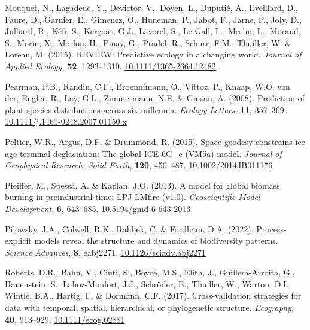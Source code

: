 \documentclass[11pt,]{article}
\newlength{\cslhangindent}
\newenvironment{CSLReferences}[2] %
 {%
  \setlength{\parindent}{0pt}
  \ifodd #1 \everypar{\setlength{\hangindent}{\cslhangindent}}\ignorespaces\fi
  \ifnum #2 > 0
  \setlength{\parskip}{#2\baselineskip}
  \fi
 }%
 {}
\begin{document}
\begin{CSLReferences}{1}{0}
\leavevmode{}%
Mouquet, N., Lagadeuc, Y., Devictor, V., Doyen, L., Duputié, A.,
Eveillard, D., Faure, D., Garnier, E., Gimenez, O., Huneman, P., Jabot,
F., Jarne, P., Joly, D., Julliard, R., Kéfi, S., Kergoat, G.J., Lavorel,
S., Le Gall, L., Meslin, L., Morand, S., Morin, X., Morlon, H., Pinay,
G., Pradel, R., Schurr, F.M., Thuiller, W. \& Loreau, M. (2015).
{REVIEW}: {Predictive} ecology in a changing world. \emph{Journal of
Applied Ecology}, \textbf{52}, 1293--1310.
\href{https://doi.org/10.1111/1365-2664.12482}{10.1111/1365-2664.12482}

\leavevmode{}%
Pearman, P.B., Randin, C.F., Broennimann, O., Vittoz, P., Knaap, W.O.
van der, Engler, R., Lay, G.L., Zimmermann, N.E. \& Guisan, A. (2008).
Prediction of plant species distributions across six millennia.
\emph{Ecology Letters}, \textbf{11}, 357--369.
\href{https://doi.org/10.1111/j.1461-0248.2007.01150.x}{10.1111/j.1461-0248.2007.01150.x}

\leavevmode{}%
Peltier, W.R., Argus, D.F. \& Drummond, R. (2015). Space geodesy
constrains ice age terminal deglaciation: {The} global {ICE}-{6G}\_c
({VM5a}) model. \emph{Journal of Geophysical Research: Solid Earth},
\textbf{120}, 450--487.
\href{https://doi.org/10.1002/2014JB011176}{10.1002/2014JB011176}

\leavevmode{}%
Pfeiffer, M., Spessa, A. \& Kaplan, J.O. (2013). A model for global
biomass burning in preindustrial time: LPJ-LMfire (v1.0).
\emph{Geoscientific Model Development}, \textbf{6}, 643--685.
\href{https://doi.org/10.5194/gmd-6-643-2013}{10.5194/gmd-6-643-2013}

\leavevmode{}%
Pilowsky, J.A., Colwell, R.K., Rahbek, C. \& Fordham, D.A. (2022).
Process-explicit models reveal the structure and dynamics of
biodiversity patterns. \emph{Science Advances}, \textbf{8}, eabj2271.
\href{https://doi.org/10.1126/sciadv.abj2271}{10.1126/sciadv.abj2271}

\leavevmode{}%
Roberts, D.R., Bahn, V., Ciuti, S., Boyce, M.S., Elith, J.,
Guillera-Arroita, G., Hauenstein, S., Lahoz-Monfort, J.J., Schröder, B.,
Thuiller, W., Warton, D.I., Wintle, B.A., Hartig, F. \& Dormann, C.F.
(2017). Cross-validation strategies for data with temporal, spatial,
hierarchical, or phylogenetic structure. \emph{Ecography}, \textbf{40},
913--929. \href{https://doi.org/10.1111/ecog.02881}{10.1111/ecog.02881}


\end{CSLReferences}
\end{document}
